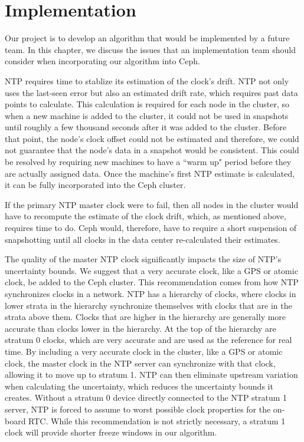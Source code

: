 \chapter{Implementation}
\label{sec:impl}

Our project is to develop an algorithm that would be implemented by a future
team. In this chapter, we discuss the issues that an implementation 
team should consider when incorporating our algorithm into Ceph.

NTP requires time to stablize its estimation of the clock's drift. 
NTP not only uses the last-seen error but also an estimated
drift rate, which requires past data points to calculate. This calculation 
is required for each node in the cluster, so when a new machine is
added to the cluster, it could not be used in snapshots until
roughly a few thousand seconds after it was added to the
cluster. Before that point, the node's clock offset could not be estimated and therefore, we could not guarantee that the node's data in a snapshot would be consistent. This could be resolved by requiring new machines to have a ``warm
up" period before they are actually assigned data. Once the machine's
first NTP estimate is calculated, it can be fully incorporated into the Ceph cluster.

If the primary NTP master clock were to fail, then all nodes in the cluster would have to recompute the estimate of the clock drift, which, as mentioned above, requires time to do. Ceph would, therefore, have to require a
short suspension of snapshotting until all clocks in the data center re-calculated their estimates.

The quality of the master NTP clock significantly impacts the size of NTP's
uncertainty bounds. We suggest that a very accurate clock, like a GPS or atomic clock, be added to the Ceph cluster. This recommendation comes from how NTP synchronizes clocks in a network. NTP has a hierarchy of clocks, where clocks in lower strata in the hierarchy synchronize themselves with clocks that are in the strata above them. Clocks that are higher in the hierarchy are generally more accurate than clocks lower in the hierarchy. At the top of the hierarchy are stratum 0 clocks, which are very accurate and are used as the reference for real time. By including a very accurate clock in the cluster, like a GPS or atomic clock, the master clock in the NTP server can synchronize with that clock, allowing it to move up to stratum 1. NTP can then eliminate upstream variation when calculating the uncertainty, which reduces the uncertainty bounds it creates. Without a stratum 0 device directly connected to the NTP stratum 1 server, NTP is forced to assume to worst possible clock properties for the on-board RTC. While this recommendation is not strictly necessary, a stratum 1 clock will provide shorter freeze windows in our algorithm.

